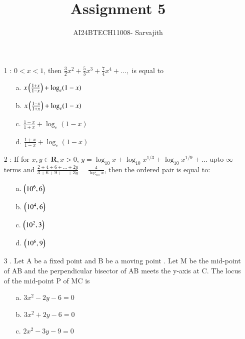 \documentclass[journal]{IEEEtran}
\begin{document}

\vspace{3cm}


\author{AI24BTECH11008- Sarvajith
}
\title{Assignment 5}
{\let\newpage\relax\maketitle}
\renewcommand{\thefigure}{\theenumi}
\renewcommand{\thetable}{\theenumi}
\setlength{\intextsep}{10pt} %
\renewcommand{\thetable}{\theenumi}
\begin{enumerate}
\item [1]: $0<x<1$, then $\frac{3}{2}x^2+\frac{5}{3}x^3+\frac{7}{4}x^4+\ldots,$ is equal to
\begin{enumerate}
    \item [a.] $x\left(\frac{1+x}{1-x}\right)+\log _e (1-x)$
    \item [b.]  $x\left(\frac{1-x}{1+x}\right)+\log _e (1-x)$
    \item [c.]  $\frac{1-x}{1+x}+\log _e (1-x)$
    \item [d.]  $\frac{1+x}{1-x}+\log _e (1-x)$
\end{enumerate}
\item[2]: If for $x,y \in \mathbf{R},x>0$, $y=\log _{10}x+\log _{10}x^{1/3}+\log _{10}x^{1/9}+\ldots$ upto $\infty$ terms and $\frac{2+4+6+\ldots+2y}{3+6+9+\ldots+3y} = \frac{4}{\log _{10}x}$, then the ordered pair  is equal to:
\begin{enumerate}
    \item [a.] $\left(10^6,6\right)$
    \item [b.] $\left(10^4,6\right)$
    \item [c.] $\left(10^2,3\right)$
    \item [d.] $\left(10^6,9\right)$
\end{enumerate}
\item[3]. Let A be a fixed point  and B be a moving
point . Let M be the mid-point of AB and the
perpendicular bisector of AB meets the y-axis at C.
The locus of the mid-point P of MC is
\begin{enumerate}
    \item [a.] $3x^2-2y-6=0$
    \item [b.] $3x^2+2y-6=0$
    \item [c.] $2x^2-3y-9=0$

\end{enumerate}
\end{enumerate}
\end{document}
